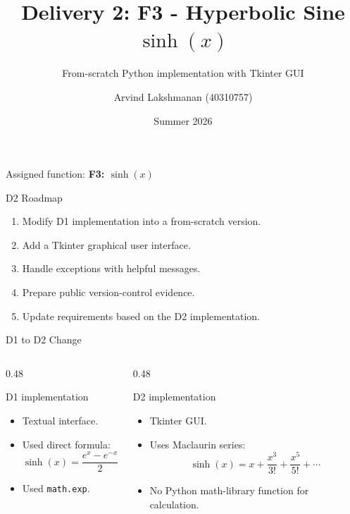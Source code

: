 \documentclass[aspectratio=169,11pt]{beamer}
\title[SOEN 6011 D2 - F3]{Delivery 2: F3 - Hyperbolic Sine $\sinh(x)$}
\subtitle{From-scratch Python implementation with Tkinter GUI}
\author{Arvind Lakshmanan (40310757)}
\institute{SOEN 6011: Software Engineering Processes\\Concordia University}
\date{Summer 2026}
\begin{document}
\begin{frame}
\titlepage
\vspace{-0.3cm}
\begin{center}
\small Assigned function: \textbf{F3: $\sinh(x)$}
\end{center}
\end{frame}

\begin{frame}{D2 Roadmap}
\large
\begin{enumerate}
    \item Modify D1 implementation into a from-scratch version.
    \item Add a Tkinter graphical user interface.
    \item Handle exceptions with helpful messages.
    \item Prepare public version-control evidence.
    \item Update requirements based on the D2 implementation.
\end{enumerate}
\end{frame}

\begin{frame}{D1 to D2 Change}
\begin{columns}[T]
\begin{column}{0.48\textwidth}
\begin{block}{D1 implementation}
\begin{itemize}
    \item Textual interface.
    \item Used direct formula:
    \[
    \sinh(x)=\frac{e^x-e^{-x}}{2}
    \]
    \item Used \texttt{math.exp}.
\end{itemize}
\end{block}
\end{column}
\begin{column}{0.48\textwidth}
\begin{block}{D2 implementation}
\begin{itemize}
    \item Tkinter GUI.
    \item Uses Maclaurin series:
    \[
    \sinh(x)=x+\frac{x^3}{3!}+\frac{x^5}{5!}+\cdots
    \]
    \item No Python math-library function for calculation.
\end{itemize}
\end{block}
\end{column}
\end{columns}
\end{frame}
\end{document}
